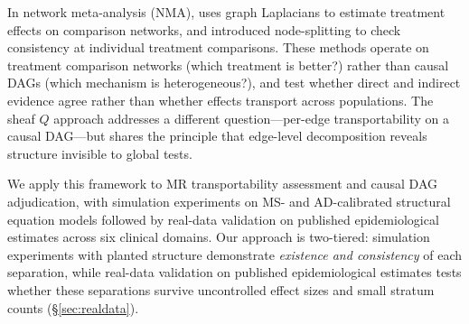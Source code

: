 \documentclass[11pt]{article}
\begin{document}
In network meta-analysis (NMA), \citet{rucker2012network} uses graph Laplacians to estimate treatment effects on comparison networks, and \citet{dias2010checking} introduced node-splitting to check consistency at individual treatment comparisons.
These methods operate on treatment comparison networks (which treatment is better?) rather than causal DAGs (which mechanism is heterogeneous?), and test whether direct and indirect evidence agree rather than whether effects transport across populations.
The sheaf $Q$ approach addresses a different question---per-edge transportability on a causal DAG---but shares the principle that edge-level decomposition reveals structure invisible to global tests.

We apply this framework to MR transportability assessment and causal DAG adjudication, with simulation experiments on MS- and AD-calibrated structural equation models followed by real-data validation on published epidemiological estimates across six clinical domains.
Our approach is two-tiered: simulation experiments with planted structure demonstrate \emph{existence and consistency} of each separation, while real-data validation on published epidemiological estimates tests whether these separations survive uncontrolled effect sizes and small stratum counts (\S\ref{sec:realdata}).
\end{document}
